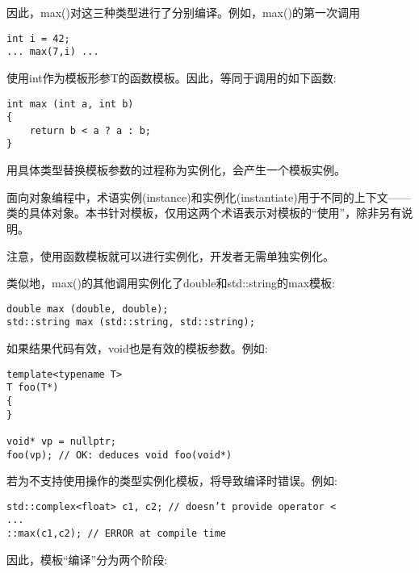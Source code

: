 因此，max()对这三种类型进行了分别编译。例如，max()的第一次调用

\begin{lstlisting}[style=styleCXX]
int i = 42;
... max(7,i) ...
\end{lstlisting}

使用int作为模板形参T的函数模板。因此，等同于调用的如下函数:

\begin{lstlisting}[style=styleCXX]
int max (int a, int b)
{
	return b < a ? a : b;
}
\end{lstlisting}

用具体类型替换模板参数的过程称为实例化，会产生一个模板实例。

\begin{tcolorbox}[colback=webgreen!5!white,colframe=webgreen!75!black]
\hspace*{0.75cm}面向对象编程中，术语实例(instance)和实例化(instantiate)用于不同的上下文——类的具体对象。本书针对模板，仅用这两个术语表示对模板的“使用”，除非另有说明。
\end{tcolorbox}

注意，使用函数模板就可以进行实例化，开发者无需单独实例化。

类似地，max()的其他调用实例化了double和std::string的max模板:

\begin{lstlisting}[style=styleCXX]
double max (double, double);
std::string max (std::string, std::string);
\end{lstlisting}

如果结果代码有效，void也是有效的模板参数。例如:

\begin{lstlisting}[style=styleCXX]
template<typename T>
T foo(T*)
{
}

void* vp = nullptr;
foo(vp); // OK: deduces void foo(void*)
\end{lstlisting}


若为不支持使用操作的类型实例化模板，将导致编译时错误。例如:

\begin{lstlisting}[style=styleCXX]
std::complex<float> c1, c2; // doesn’t provide operator <
...
::max(c1,c2); // ERROR at compile time
\end{lstlisting}

因此，模板“编译”分为两个阶段:

